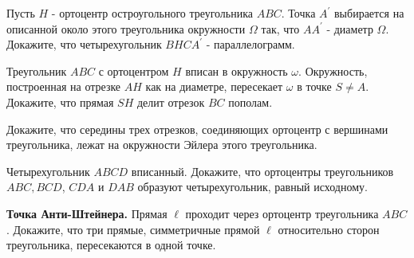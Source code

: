 Пусть $H$ - ортоцентр остроугольного треугольника $A B C$. Точка $A^{\prime}$ выбирается на описанной около этого треугольника окружности $\Omega$ так, что $A A^{\prime}$ - диаметр $\Omega$. Докажите, что четырехугольник $B H C A^{\prime}$ - параллелограмм.

Треугольник $A B C$ с ортоцентром $H$ вписан в окружность $\omega$. Окружность, построенная на отрезке $A H$ как на диаметре, пересекает $\omega$ в точке $S \neq A$. Докажите, что прямая $S H$ делит отрезок $B C$ пополам.

Докажите, что середины трех отрезков, соединяющих ортоцентр с вершинами треугольника, лежат на окружности Эйлера этого треугольника.

Четырехугольник $A B C D$ вписанный. Докажите, что ортоцентры треугольников $A B C, B C D$, $C D A$ и $D A B$ образуют четырехугольник, равный исходному.

\textbf{Точка Анти-Штейнера.} Прямая $\ell$ проходит через ортоцентр треугольника $A B C$. Докажите, что три прямые, симметричные прямой $\ell$ относительно сторон треугольника, пересекаются в одной точке.